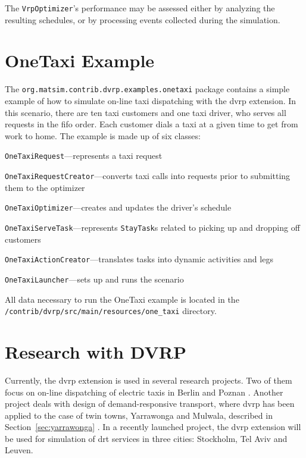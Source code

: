 The \lstinline$VrpOptimizer$'s performance may be assessed either by analyzing the resulting schedules, or by processing events collected during the simulation.

\section{OneTaxi Example}
The \lstinline$org.matsim.contrib.dvrp.examples.onetaxi$ package contains a simple example of how to simulate on-line taxi dispatching with the \gls{dvrp} extension. In this scenario, there are ten taxi customers and one taxi driver, who serves all requests in the \gls{fifo} order. Each customer dials a taxi at a given time to get from work to home. The example is made up of six classes:
%
\begin{compactitem}
	\item \lstinline$OneTaxiRequest$---represents a taxi request	
	\item \lstinline$OneTaxiRequestCreator$---converts taxi calls into requests prior to submitting them to the optimizer
	\item \lstinline$OneTaxiOptimizer$---creates and updates the driver's schedule
	\item \lstinline$OneTaxiServeTask$---represents \lstinline$StayTask$s related to picking up and dropping off customers
	\item \lstinline$OneTaxiActionCreator$---translates tasks into dynamic activities and legs
	\item \lstinline$OneTaxiLauncher$---sets up and runs the scenario
\end{compactitem}
%
All data necessary to run the OneTaxi example is located in the \lstinline$/contrib/dvrp/src/main/resources/one_taxi$ directory.

\section{Research with DVRP}
Currently, the \gls{dvrp} extension is used in several research projects. Two of them focus on on-line dispatching of electric taxis in Berlin and Poznan \citep{MaciejewskiNagel2013TaxiSimulation, MaciejewskiNagel2013OnlineTaxisVSPWP, MaciejewskiNagel2013CooperationTaxiDispatching, Maciejewski2014OnlineViaOffline}. Another project deals with design of demand-responsive transport, where \gls{dvrp} has been applied to the case of twin towns, Yarrawonga and Mulwala, described in Section~\ref{sec:yarrawonga} \citep{RonThoWin2015, ronald14SimulatingDRT}. In a recently launched project, the \gls{dvrp} extension will be used for simulation of \gls{drt} services in three cities: Stockholm, Tel Aviv and Leuven.

